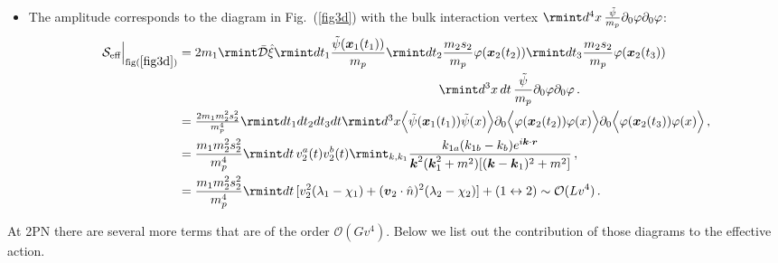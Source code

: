 \begin{itemize}
\begin{align}
\begin{split}
    \end{split}
\end{align}
Again all the  details of the computation and the functions $\lambda_{1,2},\chi_{1,2}$ are given in Appendix~(\ref{ch1:app:B}).
\item The amplitude corresponds to the diagram in Fig.~(\ref{fig3d}) with the bulk interaction vertex $\rmint d^4x\, \frac{\Tilde{\psi}}{m_p}\partial_{0}\varphi\partial_{0}\varphi$:
\begin{align}
    \begin{split}
          \mathcal{S}_{\text{eff}}\Big |_{\text{fig}(\ref{fig3d})}&=2m_1\rmint\Bar{\mathcal{D}}\Hat{\xi}\rmint dt_1 \frac{\Tilde{\psi}(\boldsymbol{x}_1(t_1))}{m_p}\rmint dt_2 \frac{m_2 s_2}{m_p}\varphi(\boldsymbol{x}_2(t_2))\rmint dt_3 \frac{m_2 s_2}{m_p}\varphi(\boldsymbol{x}_2(t_3))\\& \,\,\,\,\,\,\,\,\,\,\,\,\,\,\,\,\,\,\,\,\,\,\,\,\,\,\,\,\,\,\,\,\,\,\,\,\,\,\,\,\,\,\,\,\,\,\,\,\,\,\,\,\,\,\,\,\,\,\,\,\,\,\,\,\,\,\,\,\,\,\,\,\,\,\,\,\,\,\,\,\,\,\,\,\,\,\,\,\,\,\,\,\,\,\,\,\,\,\,\,\,\,\,\,\,\,\,\,\,\,\,\,\,\,\,\,\,\,\,\,\,\,\,\, \rmint d^3x\,dt\, \frac{\Tilde{\psi}}{m_p}\partial_{0}\varphi\partial_{0}\varphi\,.\\ &
        =\textstyle{\frac{2m_1 m_2^2 s_2^2}{m_p^4}\rmint dt_1 dt_2 dt_3 dt\rmint d^3x \Big\langle\Tilde{\psi}(\boldsymbol{x}_1(t_1))\Tilde{\psi}(x)\Big\rangle\partial_{0}\Big\langle\varphi(\boldsymbol{x}_2(t_2))\varphi(x)\Big\rangle \partial_{0}\Big\langle\varphi(\boldsymbol{x}_2(t_3))\varphi(x  )\Big\rangle}\,,\\ &
        =\frac{m_1 m_2^2 s_2^2}{m_p^4}\rmint dt \, v_2^a(t)v_2^b(t)\rmint_{k,k_1}\frac{k_{1a}(k_{1b}-k_b)e^{i\boldsymbol{k}\cdot \boldsymbol{r}}}{\boldsymbol{k}^2(\boldsymbol{k}_1^2+m^2)[(\boldsymbol{k}-\boldsymbol{k}_1)^2+m^2]}\,,\\ &
        =\frac{m_1 m_2^2 s_2^2}{m_p^4}\rmint dt \, [v_2^2(\lambda_1-\chi_1)+(\boldsymbol{v}_2\cdot \Hat{n})^2(\lambda_2-\chi_2)]+(1\leftrightarrow 2)\sim \mathcal{O}(Lv^4)\,.
    \end{split}
\end{align}
\end{itemize}
At 2PN there are several more terms that are of the order $\mathcal{O}(Gv^4)$. Below we list out the contribution of those diagrams to the effective action. 
